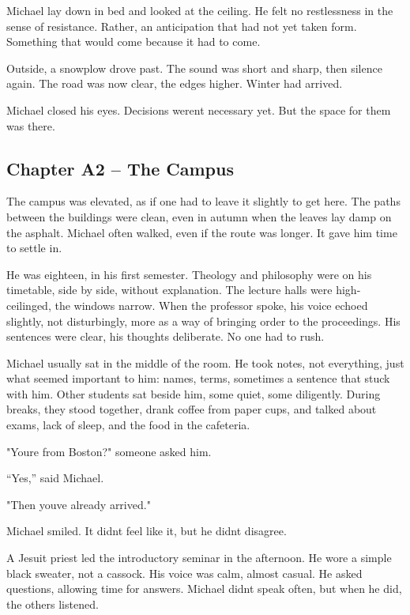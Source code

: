 \documentclass[
]{article}
\begin{document}
Michael lay down in bed and looked at the ceiling. He felt no restlessness in the sense of resistance. Rather, an anticipation that had not yet taken form. Something that would come because it had to come.

Outside, a snowplow drove past. The sound was short and sharp, then silence again. The road was now clear, the edges higher. Winter had arrived.

Michael closed his eyes. Decisions weren\textquotesingle t necessary yet. But the space for them was there.

\subsection{Chapter A2 -- The Campus}\label{chapter-a2-the-campus}

The campus was elevated, as if one had to leave it slightly to get here. The paths between the buildings were clean, even in autumn when the leaves lay damp on the asphalt. Michael often walked, even if the route was longer. It gave him time to settle in.

He was eighteen, in his first semester. Theology and philosophy were on his timetable, side by side, without explanation. The lecture halls were high-ceilinged, the windows narrow. When the professor spoke, his voice echoed slightly, not disturbingly, more as a way of bringing order to the proceedings. His sentences were clear, his thoughts deliberate. No one had to rush.

Michael usually sat in the middle of the room. He took notes, not everything, just what seemed important to him: names, terms, sometimes a sentence that stuck with him. Other students sat beside him, some quiet, some diligently. During breaks, they stood together, drank coffee from paper cups, and talked about exams, lack of sleep, and the food in the cafeteria.

"You\textquotesingle re from Boston?" someone asked him.

``Yes,'' said Michael.

"Then you\textquotesingle ve already arrived."

Michael smiled. It didn\textquotesingle t feel like it, but he didn\textquotesingle t disagree.

A Jesuit priest led the introductory seminar in the afternoon. He wore a simple black sweater, not a cassock. His voice was calm, almost casual. He asked questions, allowing time for answers. Michael didn\textquotesingle t speak often, but when he did, the others listened.
\end{document}
